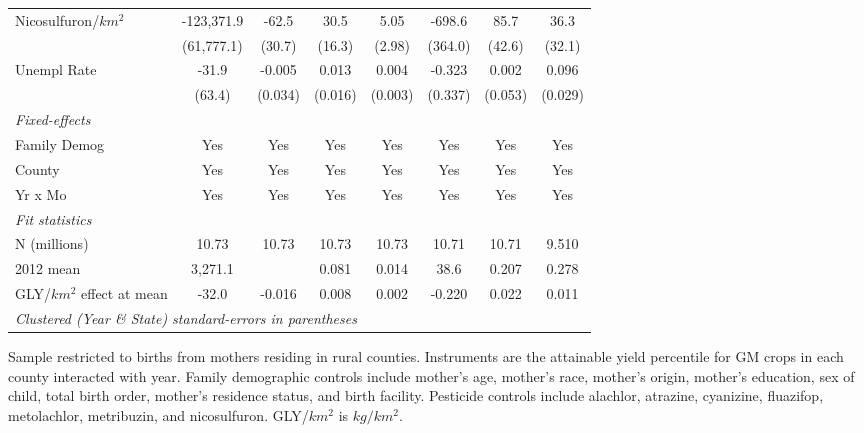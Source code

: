 \begin{table}[htbp]
\begin{tabular}{lccccccc}
      Nicosulfuron/$km^2$       & -123,371.9 & -62.5   & 30.5    & 5.05    & -698.6    & 85.7    & 36.3\\   
                                & (61,777.1) & (30.7)  & (16.3)  & (2.98)  & (364.0)   & (42.6)  & (32.1)\\   
      Unempl Rate               & -31.9      & -0.005  & 0.013   & 0.004   & -0.323    & 0.002   & 0.096\\   
                                & (63.4)     & (0.034) & (0.016) & (0.003) & (0.337)   & (0.053) & (0.029)\\   
      \midrule
      \emph{Fixed-effects}\\
      Family Demog              & Yes        & Yes     & Yes     & Yes     & Yes       & Yes     & Yes\\  
      County                    & Yes        & Yes     & Yes     & Yes     & Yes       & Yes     & Yes\\  
      Yr x Mo                   & Yes        & Yes     & Yes     & Yes     & Yes       & Yes     & Yes\\  
      \midrule
      \emph{Fit statistics}\\
      N (millions)              & 10.73      & 10.73   & 10.73   & 10.73   & 10.71     & 10.71   & 9.510\\  
      2012 mean                 & 3,271.1    &         & 0.081   & 0.014   & 38.6      & 0.207   & 0.278\\  
      GLY/$km^2$ effect at mean & -32.0      & -0.016  & 0.008   & 0.002   & -0.220    & 0.022   & 0.011\\  
      \midrule
      \multicolumn{8}{l}{\emph{Clustered (Year \& State) standard-errors in parentheses}}\\
   \end{tabular}
   
   \par \raggedright 
   Sample restricted to births from mothers residing in rural counties. Instruments are the attainable yield percentile for GM crops in each county interacted with year. Family demographic controls include mother's age, mother's race, mother's origin, mother's education, sex of child, total birth order, mother's residence status, and birth facility. Pesticide controls include alachlor, atrazine, cyanizine, fluazifop, metolachlor, metribuzin, and nicosulfuron. GLY/$km^2$ is $kg/km^2$.
\end{table}
